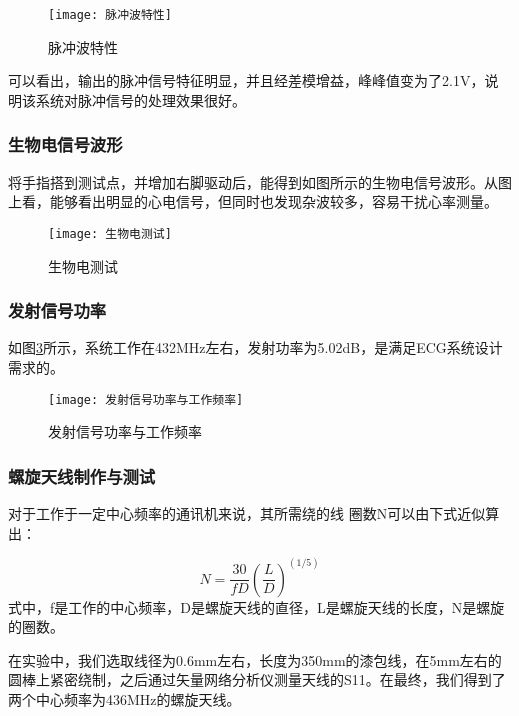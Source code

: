 \documentclass{zjureport}
\begin{document}
	\begin{figure}[h]
		\centering%
		\texttt{[image: 脉冲波特性]}
		\caption{脉冲波特性}%
		\label{脉冲波特性}%
	\end{figure}

	可以看出，输出的脉冲信号特征明显，并且经差模增益，峰峰值变为了2.1V，说明该系统对脉冲信号的处理效果很好。
	
	\subsubsection{生物电信号波形}
	
	将手指搭到测试点，并增加右脚驱动后，能得到如图所示的生物电信号波形。从图上看，能够看出明显的心电信号，但同时也发现杂波较多，容易干扰心率测量。
	
	\begin{figure}[h]
		\centering%
		\texttt{[image: 生物电测试]}
		\caption{生物电测试}%
		\label{生物电测试}%
	\end{figure}
	
	\subsubsection{发射信号功率}
	
	如图\ref{发射信号功率与工作频率}所示，系统工作在432MHz左右，发射功率为5.02dB，是满足ECG系统设计需求的。

	\begin{figure}[h]
		\centering%
		\texttt{[image: 发射信号功率与工作频率]}
		\caption{发射信号功率与工作频率}%
		\label{发射信号功率与工作频率}%
	\end{figure}

	
	\subsubsection{螺旋天线制作与测试}
	
	对于工作于一定中心频率的通讯机来说，其所需绕的线
	圈数N可以由下式近似算出：
	
	\begin{equation}
		N=\frac{30}{fD}(\frac{L}{D})^(1/5)
	\end{equation}
	式中，f是工作的中心频率，D是螺旋天线的直径，L是螺旋天线的长度，N是螺旋的圈数。
	
	在实验中，我们选取线径为0.6mm左右，长度为350mm的漆包线，在5mm左右的圆棒上紧密绕制，之后通过矢量网络分析仪测量天线的S11。在最终，我们得到了两个中心频率为436MHz的螺旋天线。
	
\end{document}

